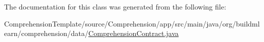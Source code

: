 The documentation for this class was generated from the following file\+:\begin{DoxyCompactItemize}
\item 
Comprehension\+Template/source/\+Comprehension/app/src/main/java/org/buildmlearn/comprehension/data/\hyperlink{ComprehensionContract_8java}{Comprehension\+Contract.\+java}\end{DoxyCompactItemize}
